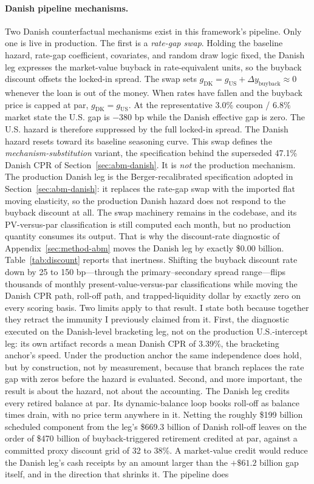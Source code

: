 \documentclass[12pt]{article}
\begin{document}
\paragraph{Danish pipeline mechanisms.}
Two Danish counterfactual mechanisms exist in this framework's pipeline. Only one is live in production. The first is a \emph{rate-gap swap}. Holding the baseline hazard, rate-gap coefficient, covariates, and random draw logic fixed, the Danish leg expresses the market-value buyback in rate-equivalent units, so the buyback discount offsets the locked-in spread. The swap sets $g_{\mathrm{DK}} = g_{\mathrm{US}} + \Delta y_{\mathrm{buyback}} \approx 0$ whenever the loan is out of the money. When rates have fallen and the buyback price is capped at par, $g_{\mathrm{DK}} = g_{\mathrm{US}}$. At the representative 3.0\% coupon / 6.8\% market state the U.S. gap is $-380$ bp while the Danish effective gap is zero. The U.S. hazard is therefore suppressed by the full locked-in spread. The Danish hazard resets toward its baseline seasoning curve. This swap defines the \emph{mechanism-substitution} variant, the specification behind the superseded 47.1\% Danish CPR of Section~\ref{sec:abm-danish}. It is \emph{not} the production mechanism. The production Danish leg is the Berger-recalibrated specification adopted in Section~\ref{sec:abm-danish}: it replaces the rate-gap swap with the imported flat moving elasticity, so the production Danish hazard does not respond to the buyback discount at all. The swap machinery remains in the codebase, and its PV-versus-par classification is still computed each month, but no production quantity consumes its output. That is why the discount-rate diagnostic of Appendix~\ref{sec:method-abm} moves the Danish leg by exactly \$0.00 billion. Table~\ref{tab:discount} reports that inertness. Shifting the buyback discount rate down by 25 to 150 bp---through the primary--secondary spread range---flips thousands of monthly present-value-versus-par classifications while moving the Danish CPR path, roll-off path, and trapped-liquidity dollar by exactly zero on every scoring basis. Two limits apply to that result. I state both because together they retract the immunity I previously claimed from it. First, the diagnostic executed on the Danish-level bracketing leg, not on the production U.S.-intercept leg: its own artifact records a mean Danish CPR of 3.39\%, the bracketing anchor's speed. Under the production anchor the same independence does hold, but by construction, not by measurement, because that branch replaces the rate gap with zeros before the hazard is evaluated. Second, and more important, the result is about the hazard, not about the accounting. The Danish leg credits every retired balance at par. Its dynamic-balance loop books roll-off as balance times drain, with no price term anywhere in it. Netting the roughly \$199 billion scheduled component from the leg's \$669.3 billion of Danish roll-off leaves on the order of \$470 billion of buyback-triggered retirement credited at par, against a committed proxy discount grid of 32 to 38\%. A market-value credit would reduce the Danish leg's cash receipts by an amount larger than the $+\$61.2$ billion gap itself, and in the direction that shrinks it. The pipeline does 
\end{document}
